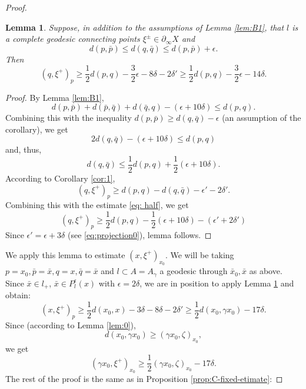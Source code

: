 \documentclass[12pt]{amsbook}%
\newtheorem{lem}[thm]{Lemma}
\theoremstyle{definition}
\theoremstyle{remark}
\numberwithin{section}{chapter}
\numberwithin{subsection}{section}
\numberwithin{figure}{chapter}
\def\half{\frac{1}{2}}
\def\eps{\epsilon}
\def\ga{\gamma}
\def\geo{\partial_\infty}
\begin{document}
{{\begin{proof}
\begin{lem}\label{lem:pq-ine}
Suppose, in addition to the assumptions of Lemma \ref{lem:B1}, 
that $l$ is a complete geodesic connecting points $\xi^\pm\in \geo X$ and 
\begin{equation}\label{eq:pq-proj}
d(p, \bar{p})\leqslant d(q, \bar{q})\leqslant d(p, \bar{p}) + \eps. 
\end{equation}
Then 
$$
(q,\xi^+)_p\geqslant %
 \half d(p,q) - \frac{3}{2}\eps - 8\delta-2\delta'\geqslant   \half d(p,q) - \frac{3}{2}\eps - 14\delta. 
$$
\end{lem}
\begin{proof} 
By Lemma \ref{lem:B1},
$$
d(p, \bar{p}) + d(\bar{p}, \bar{q}) + d(\bar{q}, q) -(\eps+10\delta)\leqslant d(p,q).
$$
Combining this with the inequality $d(p, \bar{p})\geqslant d(q, \bar{q})-  \eps$ (an assumption of the corollary), we get
 $$
2 d(q, \bar{q}) -(\eps+10\delta)\leqslant  d(p,q) 
 $$
 and, thus,
 \begin{equation}\label{eq: half}
 d(q, \bar{q}) \leqslant \half d(p,q) + \half (\eps+10\delta). 
 \end{equation}
According to  Corollary \ref{cor:1},
\begin{equation*}
(q,\xi^+)_p\geqslant d(p,q) - d(q, \bar{q}) - \eps' - 2\delta'. 
\end{equation*}
Combining this with the estimate \eqref{eq: half}, we get
$$
(q,\xi^+)_p\geqslant \half d(p,q) - \half (\eps+10\delta) - (\eps' + 2\delta')
$$
Since $\eps'=\eps+ 3\delta$ (see \eqref{eq:projection0}), lemma follows. 
\end{proof}

We apply this lemma to estimate $(x,\xi^+)_{x_0}$. We will be taking $p=x_0, \bar{p}=\bar{x}, q=x, \bar{q}=\bar{x}$ and 
$l\subset A=A_\ga$ a geodesic through $\bar{x}_0, \bar{x}$ as above. Since 
$\bar{x}\in l_+$, $\bar{x}\in P^\eps_l(x)$ with $\eps=2\delta$, we are in position to apply Lemma \ref{lem:pq-ine} and obtain:
\begin{equation}\label{eq:distance_to_xi}
(x, \xi^+)_p\geqslant  \half d(x_0, x) - 3\delta - 8\delta-2\delta'\geqslant   \half d(x_0, \ga x_0) - 17\delta. 
\end{equation}
Since (according to Lemma  \ref{lem:0}),
$$
d(x_0, \ga x_0)\geqslant (\ga x_0, \zeta)_{x_0},  
$$
we get 
$$
(\ga x_0, \xi^+)_{x_0}\geqslant  \half  (\ga x_0, \zeta)_{x_0} -17\delta.   
$$
The rest of the proof is the same as in Proposition \ref{prop:C-fixed-etimate}: 


\end{proof}}}
\end{document}

